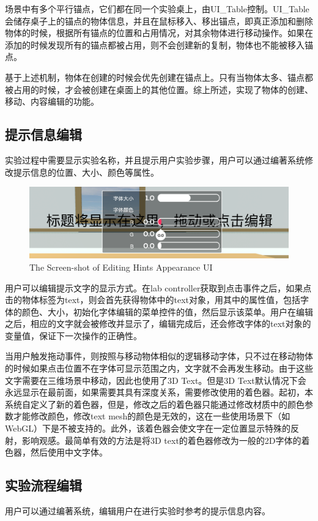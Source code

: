 场景中有多个平行锚点，它们都在同一个实验桌上，由UI\_Table控制。UI\_Table会储存桌子上的锚点的物体信息，并且在鼠标移入、移出锚点，即真正添加和删除物体的时候，根据所有锚点的位置和占用情况，对其余物体进行移动操作。如果在添加的时候发现所有的锚点都被占用，则不会创建新的复制，物体也不能被移入锚点。

基于上述机制，物体在创建的时候会优先创建在锚点上。只有当物体太多、锚点都被占用的时候，才会被创建在桌面上的其他位置。综上所述，实现了物体的创建、移动、内容编辑的功能。


\subsection{提示信息编辑}
实验过程中需要显示实验名称，并且提示用户实验步骤，用户可以通过编著系统修改提示信息的位置、大小、颜色等属性。

\begin{figure}[!htp]
  \centering
  \includegraphics[width=12cm]{figure/text.png}
    {The Screen-shot of Editing Hints Appearance UI}
 \label{fig:gm}
\end{figure}

用户可以编辑提示文字的显示方式。在lab controller获取到点击事件之后，如果点击的物体标签为text，则会首先获得物体中的text对象，用其中的属性值，包括字体的颜色、大小，初始化字体编辑的菜单控件的值，然后显示该菜单。用户在编辑之后，相应的文字就会被修改并显示了，编辑完成后，还会修改字体的text对象的变量值，保证下一次操作的正确性。

当用户触发拖动事件，则按照与移动物体相似的逻辑移动字体，只不过在移动物体的时候如果点击位置不在字体可显示范围之内，文字就不会再发生移动。由于这些文字需要在三维场景中移动，因此也使用了3D Text。但是3D Text默认情况下会永远显示在最前面，如果需要其具有深度关系，需要修改使用的着色器。起初，本系统自定义了新的着色器，但是，修改之后的着色器只能通过修改材质中的颜色参数才能修改颜色，修改text mesh的颜色是无效的，这在一些使用场景下（如WebGL）下是不被支持的。此外，该着色器会使文字在一定位置显示特殊的反射，影响观感。最简单有效的方法是将3D text的着色器修改为一般的2D字体的着色器，然后使用中文字体。

\subsection{实验流程编辑}
用户可以通过编著系统，编辑用户在进行实验时参考的提示信息内容。

